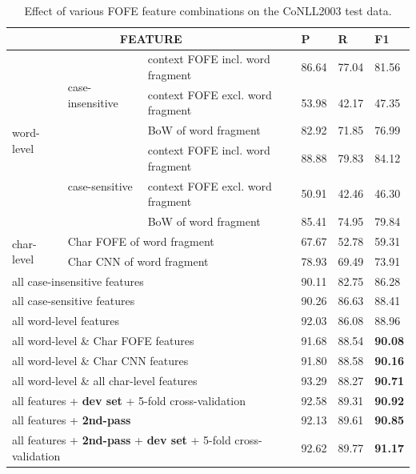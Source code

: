 \documentclass[11pt,a4paper]{article}
\begin{document}
\begin{table}[h!]
	\centering
	\begin{tabular}{|l|l|l|lll|}
		\hline
		\multicolumn{3}{|c|}{FEATURE} & P & R & F1\\
		\hline\hline
		\multirow{6}{*}{word-level} & 
		\multirow{3}{*}{case-insensitive} &
		context FOFE incl. word fragment & 86.64 & 77.04 & 81.56 \\
		& &context FOFE excl. word fragment & 53.98 & 42.17 & 47.35  \\
		& & BoW of word fragment & 82.92 & 71.85 & 76.99  \\ \cline{2-6} 
		& \multirow{3}{*}{case-sensitive} & 
		context FOFE incl. word fragment & 88.88 & 79.83 &84.12  \\
		& &context FOFE excl. word fragment & 50.91 & 42.46 & 46.30  \\
		& & BoW of word fragment & 85.41 & 74.95 & 79.84  \\ \hline
		\multirow{2}{*}{char-level} &
		\multicolumn{2}{l|}{Char FOFE of word fragment} & 67.67 & 52.78 & 59.31  \\
		& \multicolumn{2}{l|}{Char CNN of word fragment} & 78.93 & 69.49 & 73.91 \\ \hline
		\multicolumn{3}{|l|}{all case-insensitive features} &  90.11 & 82.75 &  86.28  \\ 
		\multicolumn{3}{|l|}{all case-sensitive features} & 90.26 & 86.63 & 88.41 \\ 
		\multicolumn{3}{|l|}{all word-level features} & 92.03 & 86.08 & 88.96  \\ \hline
		\multicolumn{3}{|l|}{all word-level \& Char FOFE features} & 91.68 &  88.54 & \bf 90.08 \\
		\multicolumn{3}{|l|}{all word-level \& Char CNN features} & 91.80 & 88.58 & \bf 90.16 \\ \hline
		\multicolumn{3}{|l|}{all word-level \& all char-level features}  & 93.29 &  88.27 &  \bf 90.71  \\
		\multicolumn{3}{|l|}{all features + {\bf dev set} + 5-fold cross-validation} & 92.58 &  89.31 &  \bf 90.92  \\
		\multicolumn{3}{|l|}{all features + {\bf 2nd-pass}} & 92.13 &  89.61 &  \bf 90.85  \\
		\multicolumn{3}{|l|}{all features + {\bf 2nd-pass} + {\bf dev set} + 5-fold cross-validation} & 92.62 &  89.77 &  \bf 91.17 \\
		\hline
	\end{tabular}
	\caption{Effect of various FOFE feature combinations on the CoNLL2003 test data.}
	\label{tbl:feat-cmp:CoNLL03}
\end{table}
\end{document}
